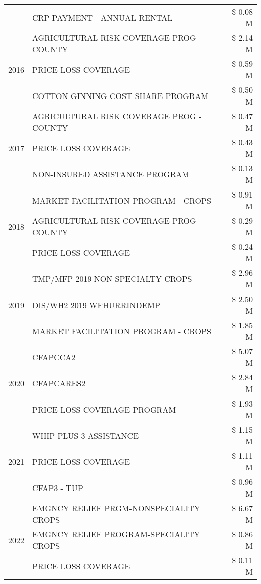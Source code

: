 \begin{tabular}{llr}
 & CRP PAYMENT - ANNUAL RENTAL & \$ 0.08 M \\
\cline{1-3}
\multirow[t]{3}{*}{2016} & AGRICULTURAL RISK COVERAGE PROG - COUNTY & \$ 2.14 M \\
 & PRICE LOSS COVERAGE & \$ 0.59 M \\
 & COTTON GINNING COST SHARE PROGRAM & \$ 0.50 M \\
\cline{1-3}
\multirow[t]{3}{*}{2017} & AGRICULTURAL RISK COVERAGE PROG - COUNTY & \$ 0.47 M \\
 & PRICE LOSS COVERAGE & \$ 0.43 M \\
 & NON-INSURED ASSISTANCE PROGRAM & \$ 0.13 M \\
\cline{1-3}
\multirow[t]{3}{*}{2018} & MARKET FACILITATION PROGRAM - CROPS & \$ 0.91 M \\
 & AGRICULTURAL RISK COVERAGE PROG - COUNTY & \$ 0.29 M \\
 & PRICE LOSS COVERAGE & \$ 0.24 M \\
\cline{1-3}
\multirow[t]{3}{*}{2019} & TMP/MFP 2019 NON SPECIALTY CROPS & \$ 2.96 M \\
 & DIS/WH2 2019 WFHURRINDEMP & \$ 2.50 M \\
 & MARKET FACILITATION PROGRAM - CROPS & \$ 1.85 M \\
\cline{1-3}
\multirow[t]{3}{*}{2020} & CFAPCCA2 & \$ 5.07 M \\
 & CFAPCARES2 & \$ 2.84 M \\
 & PRICE LOSS COVERAGE PROGRAM & \$ 1.93 M \\
\cline{1-3}
\multirow[t]{3}{*}{2021} & WHIP PLUS 3 ASSISTANCE & \$ 1.15 M \\
 & PRICE LOSS COVERAGE & \$ 1.11 M \\
 & CFAP3 - TUP & \$ 0.96 M \\
\cline{1-3}
\multirow[t]{3}{*}{2022} & EMGNCY RELIEF PRGM-NONSPECIALITY CROPS & \$ 6.67 M \\
 & EMGNCY RELIEF PROGRAM-SPECIALITY CROPS & \$ 0.86 M \\
 & PRICE LOSS COVERAGE & \$ 0.11 M \\
\cline{1-3}
\bottomrule
\end{tabular}
